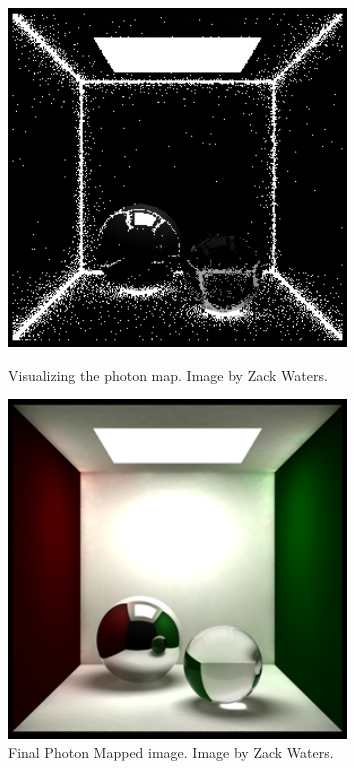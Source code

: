 \begin{figure}[ht]
	\begin{minipage}[b]{0.5\linewidth}
		\centering
		\includegraphics[width=0.8\textwidth]{Media/prev_work_photon_viz.png}
		\caption{Visualizing the photon map. Image by Zack Waters.}
		\label{fig:photon map viz}
	\end{minipage}
		\hspace{0.5cm}
		\begin{minipage}[b]{0.5\linewidth}
			\centering
		  \includegraphics[width=0.8\textwidth]{Media/prev_work_photon_render.png}
		  \caption{Final Photon Mapped image. Image by Zack Waters.}
		  \label{fig:photon map render}
		\end{minipage}
\end{figure}	
	
